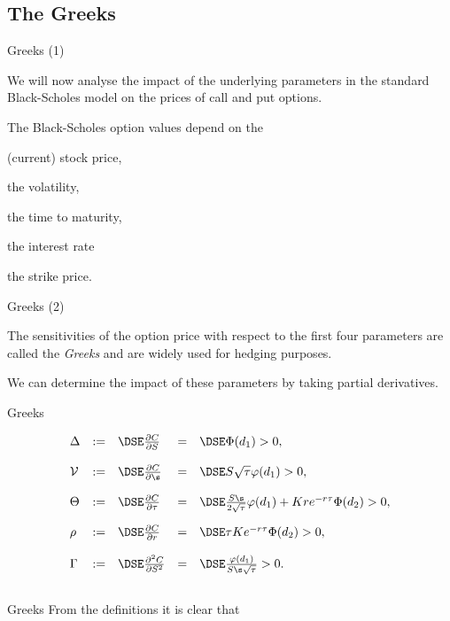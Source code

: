\subsection{The Greeks}

{Greeks (1)}


	We will now analyse the impact of the
underlying parameters in the standard Black-Scholes model on the
prices of call and put options.

	The Black-Scholes option values
depend on the


	(current) stock price,

	the volatility,

	the time to maturity,

	the interest rate

	the strike price.



{Greeks (2)}


	The
sensitivities of the option price with respect to the first four
parameters are called the {\it Greeks} and are widely used for
hedging purposes.

	We can determine the impact of these parameters
by taking partial derivatives.


{Greeks}

$$
\begin{array}{lllll}
\Delta &:=&\DSE \frac{\partial C}{\partial S} &=&\DSE \Phi(d_1) >
0,\\*[12pt]
{\cal V} &:=&\DSE \frac{\partial C}{\partial \s} &=&
\DSE S \sqrt{\tau} \varphi(d_1) >0,\\*[12pt]
 \Theta &:=&\DSE \frac{\partial
C}{\partial \tau} &=& \DSE \frac{S \s}{2 \sqrt{\tau}} \varphi(d_1) + K r
e^{-r\tau} \Phi(d_2) >0,\\*[12pt]
\rho &:=&\DSE \frac{\partial
C}{\partial r} &=& \DSE \tau K e^{-r\tau} \Phi(d_2) >0,\\*[12pt] \Gamma
&:=&\DSE \frac{\partial^2 C}{\partial S^2} &=& \DSE
\frac{\varphi(d_1)}{S \s \sqrt{\tau}} >0.\\*[12pt]
\end{array}
$$

{Greeks} From the definitions it is clear that

